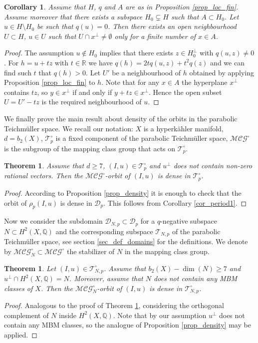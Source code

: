 \documentclass[11pt]{article}
\newcommand{\6}{\partial}
\newcommand{\bbQ}{\mathbb{Q}}
\newcommand{\bbR}{\mathbb{R}}
\newcommand{\DD}{\mathcal{D}}
\renewcommand{\ge}{\geqslant}
\newcommand{\Teich}{\mathcal{T}}
\newcommand{\TeichP}{\Teich_p}
\newcommand{\MC}{\mathcal{MCG}}
\newcommand{\Dom}{\mathcal{D}}
\newcommand{\DomP}{\Dom_p}
\newcommand{\Per}{\rho}
\newcommand{\PerP}{\Per_p}
\newtheorem{thm}[defn]{Theorem}
\newtheorem{cor}[defn]{Corollary}
\begin{document}
\begin{cor}\label{cor_loc_fin}
Assume that $H$, $q$ and $A$ are as in Proposition \ref{prop_loc_fin}. Assume moreover
that there exists a subspace $H_0\subsetneq H$ such that $A\subset H_0$.
Let $u\in H\setminus H_0$ be such that $q(u) = 0$. Then there exists
an open neighbourhood $U\subset H$, $u\in U$ such that $U\cap x^\perp\neq\emptyset$
only for a finite number of $x\in A$.
\end{cor}
\begin{proof}
The assumption $u\notin H_0$ implies that there exists $z\in H_0^\perp$ with $q(u,z)\neq 0$.
For $h = u + tz$ with $t\in \bbR$ we have $q(h) = 2tq(u,z) + t^2q(z)$ and we can
find such $t$ that $q(h)>0$. Let $U'$ be a neighbourhood of $h$ obtained by applying
Proposition \ref{prop_loc_fin} to $h$. Note that for any $x\in A$ the hyperplane $x^\perp$
contains $tz$, so $y\in x^\perp$ if and only if $y + tz\in x^\perp$. Hence the open subset
$U = U' - tz$ is the required neighbourhood of $u$.
\end{proof}

We finally prove the main result about density of the orbits in the parabolic Teichm\"uller space.
We recall our notation: $X$ is a hyperk\"ahler manifold, $d = b_2(X)$, $\TeichP^\circ$ is a fixed
component of the parabolic Teichm\"uller space, $\MC^\circ$ is the subgroup of the mapping
class group that acts on $\TeichP^\circ$.

\begin{thm}\label{thm_density}
Assume that $d\ge 7$, $(I,u)\in \TeichP^\circ$ and $u^\perp$ does not contain non-zero rational vectors. Then
the $\MC^\circ$-orbit of $(I,u)$ is dense in $\TeichP^\circ$.
\end{thm}
\begin{proof}
According to Proposition \ref{prop_density} it is enough to check that the orbit 
of $\PerP(I,u)$ is dense in $\DomP$. This follows from Corollary \ref{cor_period1}.
\end{proof}

Now we consider the subdomain $\DD_{N,p}\subset\DomP$ for a $q$-negative subspace $N\subset H^2(X,\bbQ)$
and the corresponding subspace $\Teich_{N,p}$ of the parabolic Teichm\"uller space, see section \ref{sec_def_domains} for
the definitions. We denote by $\MC^\circ_N\subset \MC^\circ$ the stabilizer of $N$ in the mapping class group.

\begin{thm}\label{thm_density2}
Let $(I,u)\in \Teich_{N,p}^\circ$.
Assume that $b_2(X) - \dim(N) \ge 7$ and $u^\perp\cap H^2(X,\bbQ) = N$.
Moreover, assume that $N$ does not contain any MBM classes of $X$.
Then the $\MC_N^\circ$-orbit of $(I,u)$ is dense in $\Teich_{N,p}^\circ$.
\end{thm}
\begin{proof}
Analogous to the proof of Theorem \ref{thm_density}, considering
the orthogonal complement of $N$ inside $H^2(X,\bbQ)$. Note that
by our assumption $u^\perp$ does not contain any MBM classes,
so the analogue of Proposition \ref{prop_density} may be applied. 
\end{proof}
\end{document}

